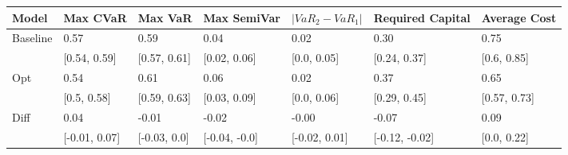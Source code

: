 \begin{tabular}{lllllll}
\toprule
   Model &      Max CVaR &      Max VaR &   Max SemiVar & $|VaR_2 - VaR_1|$ & Required Capital & Average Cost \\
\midrule
Baseline &          0.57 &         0.59 &          0.04 &              0.02 &             0.30 &         0.75 \\
         &  [0.54, 0.59] & [0.57, 0.61] &  [0.02, 0.06] &       [0.0, 0.05] &     [0.24, 0.37] &  [0.6, 0.85] \\
     Opt &          0.54 &         0.61 &          0.06 &              0.02 &             0.37 &         0.65 \\
         &   [0.5, 0.58] & [0.59, 0.63] &  [0.03, 0.09] &       [0.0, 0.06] &     [0.29, 0.45] & [0.57, 0.73] \\
    Diff &          0.04 &        -0.01 &         -0.02 &             -0.00 &            -0.07 &         0.09 \\
         & [-0.01, 0.07] & [-0.03, 0.0] & [-0.04, -0.0] &     [-0.02, 0.01] &   [-0.12, -0.02] &  [0.0, 0.22] \\
\bottomrule
\end{tabular}
